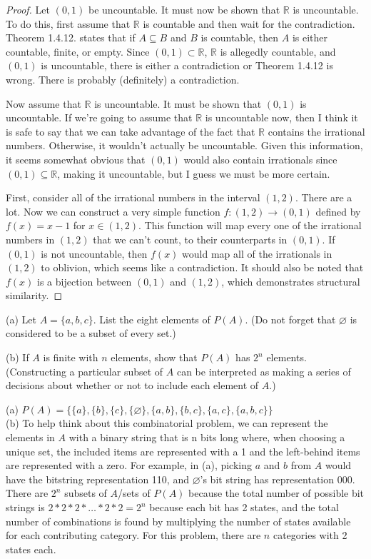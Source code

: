 \documentclass[12pt]{article}
\newcommand{\R}{\mathbb{R}}
\newenvironment{exercise}[2][Exercise]{\begin{trivlist}
\item[\hskip \labelsep {\bfseries #1}\hskip \labelsep {\bfseries #2.}]}{\end{trivlist}}
\begin{document}
\begin{proof}

Let $(0,1)$ be uncountable. It must now be shown that $\R$ is uncountable. To do this, first assume that $\R$ is countable and then wait for the contradiction. Theorem 1.4.12. states that if $A \subseteq B$ and $B$ is countable, then $A$ is either countable, finite, or empty. Since $(0,1) \subset \R$, $\R$ is allegedly countable, and $(0,1)$ is uncountable, there is either a contradiction or Theorem 1.4.12 is wrong. There is probably (definitely) a contradiction. 

Now assume that $\R$ is uncountable. It must be shown that $(0,1)$ is uncountable. If we're going to assume that $\R$ is uncountable now, then I think it is safe to say that we can take advantage of the fact that $\R$ contains the irrational numbers. Otherwise, it wouldn't actually be uncountable. Given this information, it seems somewhat obvious that $(0,1)$ would also contain irrationals since $(0,1) \subseteq \R$, making it uncountable, but I guess we must be more certain. 

First, consider all of the irrational numbers in the interval $(1,2)$. There are a lot. Now we can construct a very simple function $f: (1,2) \rightarrow (0,1)$ defined by $f(x) = x - 1$ for $x \in (1,2)$. This function will map every one of the irrational numbers in $(1,2)$ that we can't count, to their counterparts in $(0,1)$. If $(0,1)$ is not uncountable, then $f(x)$ would map all of the irrationals in $(1,2)$ to oblivion, which seems like a contradiction. It should also be noted that $f(x)$ is a bijection between $(0,1)$ and $(1,2)$, which demonstrates structural similarity.

\end{proof}

\begin{exercise}{1.5.5}
(a) Let $A = \{a,b,c\}$. List the eight elements of $P(A)$. (Do not forget that $\varnothing$ is considered to be a subset of every set.) 

(b) If $A$ is finite with $n$ elements, show that $P(A)$ has $2^n$ elements. (Constructing a particular subset of $A$ can be interpreted as making a series of decisions about whether or not to include each element of $A$.)
\end{exercise}

\noindent (a) $P(A) = \{\{a\},\{b\},\{c\},\{\varnothing\},\{a,b\},\{b,c\},\{a,c\},\{a,b,c\}\}$ \\
\noindent (b) To help think about this combinatorial problem, we can represent the elements in $A$ with a binary string that is n bits long where, when choosing a unique set, the included items are represented with a 1 and the left-behind items are represented with a zero. For example, in (a), picking $a$ and $b$ from $A$ would have the bitstring representation 110, and $\varnothing$'s bit string has representation 000. There are $2^n$ subsets of $A$/sets of $P(A)$ because the total number of possible bit strings is $2*2*2*\ldots*2*2 = 2^n$ because each bit has 2 states, and the total number of combinations is found by multiplying the number of states available for each contributing category. For this problem, there are $n$ categories with 2 states each.
\end{document}
